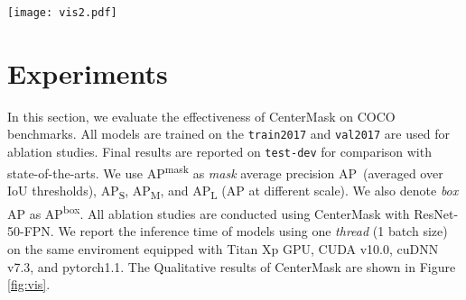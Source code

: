 \documentclass[10pt,twocolumn,letterpaper]{article}
\begin{document}
\begin{figure*}[t]
\centering
\texttt{[image: vis2.pdf]} 
\caption{Results of CenterMask with VoVNetV2-99 on COCO \texttt{test-dev2017}.}
\label{fig:vis}
\end{figure*}


\section{Experiments}
In this section, we evaluate the effectiveness of CenterMask on COCO~\cite{lin2014microsoft} benchmarks. All models are trained on the \texttt{train2017} and \texttt{val2017} are used for ablation studies. Final results are reported on \texttt{test-dev} for comparison with state-of-the-arts.
We use AP\textsuperscript{mask} as \textit{mask} average precision AP~(averaged over IoU thresholds), AP\textsubscript{S}, AP\textsubscript{M}, and AP\textsubscript{L} (AP at different scale). We also denote \textit{box} AP as AP\textsuperscript{box}.
All ablation studies are conducted using CenterMask with ResNet-50-FPN.
We report the inference time of models using one \textit{thread} (1 batch size) on the same enviroment equipped with Titan Xp GPU, CUDA v10.0, cuDNN v7.3, and pytorch1.1.
The Qualitative results of CenterMask are shown in Figure \ref{fig:vis}.


\begin{table}[t]
      \centering
        \caption{\textbf{Spatial Attention Guided Mask~(SAG-Mask)}\\These models use ResNet-50 backbone. We note that the mask heads with Eq.\ref{eq:1} is same as the mask branch of Mask R-CNN. SAM and Scoring denotes the proposed Spatial Attention Module and mask scoring~\cite{
        huang2019mask}.  \mbox{} }
        \label{tab:mask}\vspace{-0.3cm}
\end{table}
\end{document}
